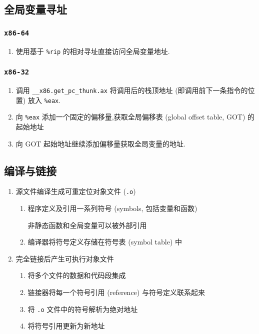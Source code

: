         \subsection{全局变量寻址}
            \subsubsection{\texttt{x86-64}}
                \begin{enumerate}
                    \item 使用基于 \texttt{\%rip} 的相对寻址直接访问全局变量地址.
                \end{enumerate}
            \subsubsection{\texttt{x86-32}}
                \begin{enumerate}
                    \item 调用 \texttt{\_\_x86.get\_pc\_thunk.ax} 将调用后的栈顶地址 (即调用前下一条指令的位置) 放入 \texttt{\%eax}.
                    \item 向 \texttt{\%eax} 添加一个固定的偏移量,获取全局偏移表 (global offset table, GOT) 的起始地址
                    \item 向 GOT 起始地址继续添加偏移量获取全局变量的地址.
                \end{enumerate}
        \subsection{编译与链接}
        \begin{enumerate}
            \item 源文件编译生成可重定位对象文件 (\texttt{.o})
                \begin{enumerate}
                    \item 程序定义及引用一系列符号 (symbols, 包括变量和函数)

                        非静态函数和全局变量可以被外部引用
                    \item 编译器将符号定义存储在符号表 (symbol table) 中
                \end{enumerate}
            \item 完全链接后产生可执行对象文件
                \begin{enumerate}
                    \item 将多个文件的数据和代码段集成
                    \item 链接器将每一个符号引用 (reference) 与符号定义联系起来
                    \item 将 \texttt{.o} 文件中的符号解析为绝对地址
                    \item 将符号引用更新为新地址
                \end{enumerate}
        \end{enumerate}

